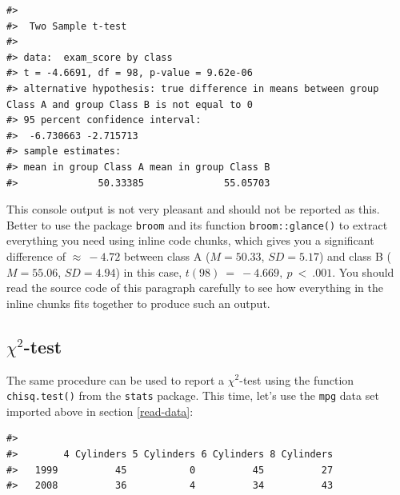 \documentclass[
  11pt,
  a4paper,
  twoside]{scrbook}
\newenvironment{Shaded}{\begin{snugshade}}{\end{snugshade}}
\newcommand{\CommentTok}[1]{\textcolor[rgb]{0.56,0.35,0.01}{\textit{#1}}}
\newcommand{\FunctionTok}[1]{\textcolor[rgb]{0.00,0.00,0.00}{#1}}
\newcommand{\NormalTok}[1]{#1}
\newcommand{\OtherTok}[1]{\textcolor[rgb]{0.56,0.35,0.01}{#1}}
\newcommand{\SpecialCharTok}[1]{\textcolor[rgb]{0.00,0.00,0.00}{#1}}
\begin{document}
\linespread{1}

\begin{verbatim}
#> 
#>  Two Sample t-test
#> 
#> data:  exam_score by class
#> t = -4.6691, df = 98, p-value = 9.62e-06
#> alternative hypothesis: true difference in means between group Class A and group Class B is not equal to 0
#> 95 percent confidence interval:
#>  -6.730663 -2.715713
#> sample estimates:
#> mean in group Class A mean in group Class B 
#>              50.33385              55.05703
\end{verbatim}

This console output is not very pleasant and should not be reported as this. Better to use the package \texttt{broom} and its function \texttt{broom::glance()} to extract everything you need using inline code chunks, which gives you a significant difference of \(\approx~-4.72\) between class A (\(M = 50.33\), \(SD = 5.17\)) and class B (\(M = 55.06\), \(SD = 4.94\)) in this case, \(t(98)~=~-4.669,~p~<~.001\). You should read the source code of this paragraph carefully to see how everything in the inline chunks fits together to produce such an output.

\hypertarget{chi2-test}{%
\subsection{\texorpdfstring{\(\chi^2\)-test}{\textbackslash chi\^{}2-test}}\label{chi2-test}}

The same procedure can be used to report a \(\chi^2\)-test using the function \texttt{chisq.test()} from the \texttt{stats} package. This time, let's use the \texttt{mpg} data set imported above in section \ref{read-data}:

\linespread{1}

\begin{Shaded}
\end{Shaded}

\linespread{1}

\begin{verbatim}
#>       
#>        4 Cylinders 5 Cylinders 6 Cylinders 8 Cylinders
#>   1999          45           0          45          27
#>   2008          36           4          34          43
\end{verbatim}
\end{document}

